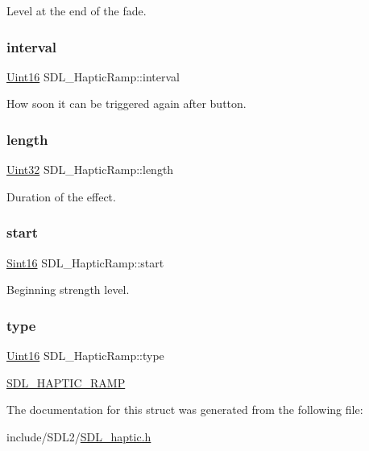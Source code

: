 Level at the end of the fade. \mbox{\label{struct_s_d_l___haptic_ramp_a4b89d108cfa7e96ea58b58771334c33d}} 
\subsubsection{\texorpdfstring{interval}{interval}}
{\footnotesize\ttfamily \hyperlink{_s_d_l__stdinc_8h_a31fcc0a076c9068668173ee26d33e42b}{Uint16} S\+D\+L\+\_\+\+Haptic\+Ramp\+::interval}

How soon it can be triggered again after button. \mbox{\label{struct_s_d_l___haptic_ramp_a57e75237507701405af2a3caf34cdb5a}} 
\subsubsection{\texorpdfstring{length}{length}}
{\footnotesize\ttfamily \hyperlink{_s_d_l__stdinc_8h_add440eff171ea5f55cb00c4a9ab8672d}{Uint32} S\+D\+L\+\_\+\+Haptic\+Ramp\+::length}

Duration of the effect. \mbox{\label{struct_s_d_l___haptic_ramp_acc0e813ac6399290fd4a788d2471e8d4}} 
\subsubsection{\texorpdfstring{start}{start}}
{\footnotesize\ttfamily \hyperlink{_s_d_l__stdinc_8h_a9d0257032c0e146ab6121bf0122712f5}{Sint16} S\+D\+L\+\_\+\+Haptic\+Ramp\+::start}

Beginning strength level. \mbox{\label{struct_s_d_l___haptic_ramp_aca1c2349372433822ab62f60976640aa}} 
\subsubsection{\texorpdfstring{type}{type}}
{\footnotesize\ttfamily \hyperlink{_s_d_l__stdinc_8h_a31fcc0a076c9068668173ee26d33e42b}{Uint16} S\+D\+L\+\_\+\+Haptic\+Ramp\+::type}

\hyperlink{_s_d_l__haptic_8h_af10eb937a64a8f602e9c46682ac0d868}{S\+D\+L\+\_\+\+H\+A\+P\+T\+I\+C\+\_\+\+R\+A\+MP} 

The documentation for this struct was generated from the following file\+:\begin{DoxyCompactItemize}
\item 
include/\+S\+D\+L2/\hyperlink{_s_d_l__haptic_8h}{S\+D\+L\+\_\+haptic.\+h}\end{DoxyCompactItemize}
